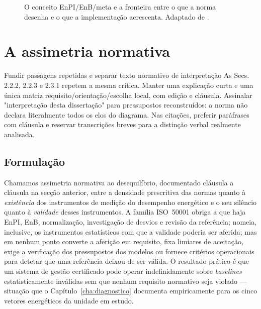 \begin{figure}[htbp]
  \centering
  \caption[O conceito EnPI/EnB/meta e a extensão de implementação]{O conceito EnPI/EnB/meta e a fronteira entre o que a norma desenha e o que a implementação acrescenta. Adaptado de \cite[Figura~1]{ISO50006_2014}.}
  \label{fig:enpi-enb-meta}
\end{figure}

\section{A assimetria normativa}
\label{sec:assimetria}
{Fundir passagens repetidas e separar texto normativo de interpretação}
{As Secs. 2.2.2, 2.2.3 e 2.3.1 repetem a mesma crítica. Manter uma
explicação curta e uma única matriz requisito/orientação/escolha local,
com edição e cláusula. Assinalar "interpretação desta dissertação" para
pressupostos reconstruídos: a norma não declara literalmente todos os
elos do diagrama. Nas citações, preferir paráfrases com cláusula e
reservar transcrições breves para a distinção verbal realmente analisada.}%

\subsection{Formulação}
\label{sec:assimetria-formulacao}

Chamamos assimetria normativa ao desequilíbrio, documentado cláusula a cláusula na secção anterior, entre a densidade prescritiva das normas quanto à \emph{existência} dos instrumentos de medição do desempenho energético e o seu silêncio quanto à \emph{validade} desses instrumentos. A família ISO~50001 obriga a que haja EnPI, EnB, normalização, investigação de desvios e revisão da referência; nomeia, inclusive, os instrumentos estatísticos com que a validade poderia ser aferida; mas em nenhum ponto converte a aferição em requisito, fixa limiares de aceitação, exige a verificação dos pressupostos dos modelos ou fornece critérios operacionais para detetar que uma referência deixou de ser válida. O resultado prático é que um sistema de gestão certificado pode operar indefinidamente sobre \emph{baselines} estatisticamente inválidas sem que nenhum requisito normativo seja violado --- situação que o Capítulo~\ref{cha:diagnostico} documenta empiricamente para os cinco vetores energéticos da unidade em estudo.

